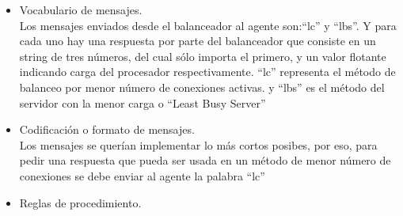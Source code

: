 \begin{itemize}
   \item Vocabulario de mensajes.\\
   Los mensajes enviados desde el balanceador al agente son:``lc'' y ``lbs''. Y para cada uno hay una respuesta por parte del balanceador que consiste
   en un string de tres números, del cual sólo importa el primero, y un valor flotante indicando carga del procesador respectivamente.
   ``lc'' representa el método de balanceo por menor número de conexiones activas. y ``lbs'' es el método del servidor con la menor carga o
   ``Least Busy Server''
    \item Codificación o formato de mensajes.\\
    Los mensajes se querían implementar lo más cortos posibes, por eso, para pedir una respuesta que pueda ser usada en un método de menor número
    de conexiones se debe enviar al agente la palabra ``lc''
     \item Reglas de procedimiento.\\
 \end{itemize}